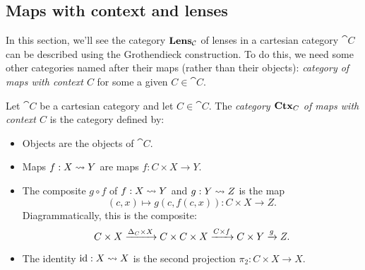 \documentclass[DynamicalBook]{subfiles}
\begin{document}
\subsection{Maps with context and lenses}\label{sec.context_indexed_cat}

In this section, we'll see the category $\textbf{Lens}_{\mathcal{C}}$ of lenses in a
cartesian category $\cat{C}$ can be described using
the Grothendieck construction. To do this, we need some other categories named
after their maps (rather than their objects): 
\emph{category of maps with context $C$} for some a given $C \in \cat{C}$. 

\begin{definition}
  Let $\cat{C}$ be a cartesian category and let $C \in \cat{C}$. The
  \emph{category $\textbf{Ctx}_{C}$ of maps with context $C$}
  is the category defined by:
  \begin{itemize}
    \item Objects are the objects of $\cat{C}$.
    \item Maps $f : X \rightsquigarrow Y$ are maps $f : C \times X \to Y$.
    \item The composite $g \circ f$ of $f : X \rightsquigarrow Y$ and $g : Y \rightsquigarrow Z$ is
      the map
       $$(c, x) \mapsto g(c, f(c, x)) : C \times X \to Z.$$
       Diagrammatically, this is the composite:
       $$C \times X \xrightarrow{\Delta_C \times X} C \times C \times X \xrightarrow{C \times f}
       C \times Y \xrightarrow{g} Z.$$
    \item The identity $\mathrm{id} : X \rightsquigarrow X$ is the second projection $\pi_2 : C
      \times X \to X$.
  \end{itemize}
\end{definition}
\end{document}
